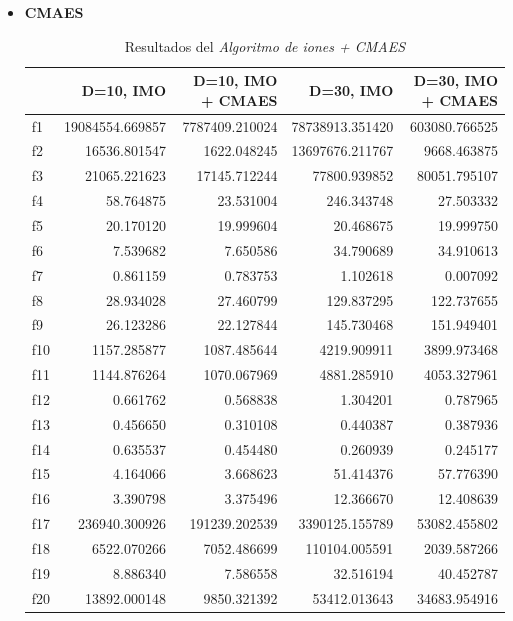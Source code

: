 \documentclass[a4paper,11pt]{article}
\begin{document}
\begin{itemize}
\begin{itemize}
  
  \item \textbf{CMAES}
  \begin{table}[H]	
  \caption{Resultados del \textit{Algoritmo de iones + CMAES}}
  \centering
  \begin{tabular}{|l|r|r|||r|r|}
  \hline
  & \textbf{D=10, IMO} & \textbf{D=10, IMO + CMAES} & \textbf{D=30, IMO} & \textbf{D=30, IMO + CMAES}\\ \hline
  f1 &  19084554.669857 &  7787409.210024 &  78738913.351420 &  603080.766525 \\ \hline
  f2 &  16536.801547 &  1622.048245 &  13697676.211767 &  9668.463875 \\ \hline
  f3 &  21065.221623 &  17145.712244 &  77800.939852 &  80051.795107 \\ \hline
  f4 &  58.764875 &  23.531004 &  246.343748 &  27.503332 \\ \hline
  f5 &  20.170120 &  19.999604 &  20.468675 &  19.999750 \\ \hline
  f6 &  7.539682 &  7.650586 &  34.790689 &  34.910613 \\ \hline
  f7 &  0.861159 &  0.783753 &  1.102618 &  0.007092 \\ \hline
  f8 &  28.934028 &  27.460799 &  129.837295 &  122.737655 \\ \hline
  f9 &  26.123286 &  22.127844 &  145.730468 &  151.949401 \\ \hline
  f10 &  1157.285877 &  1087.485644 &  4219.909911 &  3899.973468 \\ \hline
  f11 &  1144.876264 &  1070.067969 &  4881.285910 &  4053.327961 \\ \hline
  f12 &  0.661762 &  0.568838 &  1.304201 &  0.787965 \\ \hline
  f13 &  0.456650 &  0.310108 &  0.440387 &  0.387936 \\ \hline
  f14 &  0.635537 &  0.454480 &  0.260939 &  0.245177 \\ \hline
  f15 &  4.164066 &  3.668623 &  51.414376 &  57.776390 \\ \hline
  f16 &  3.390798 &  3.375496 &  12.366670 &  12.408639 \\ \hline
  f17 &  236940.300926 &  191239.202539 &  3390125.155789 &  53082.455802 \\ \hline
  f18 &  6522.070266 &  7052.486699 &  110104.005591 &  2039.587266 \\ \hline
  f19 &  8.886340 &  7.586558 &  32.516194 &  40.452787 \\ \hline
  f20 &  13892.000148 &  9850.321392 &  53412.013643 &  34683.954916 \\ \hline
  \end{tabular}
  \end{table}
  

\end{itemize}
\end{itemize}
\end{document}
